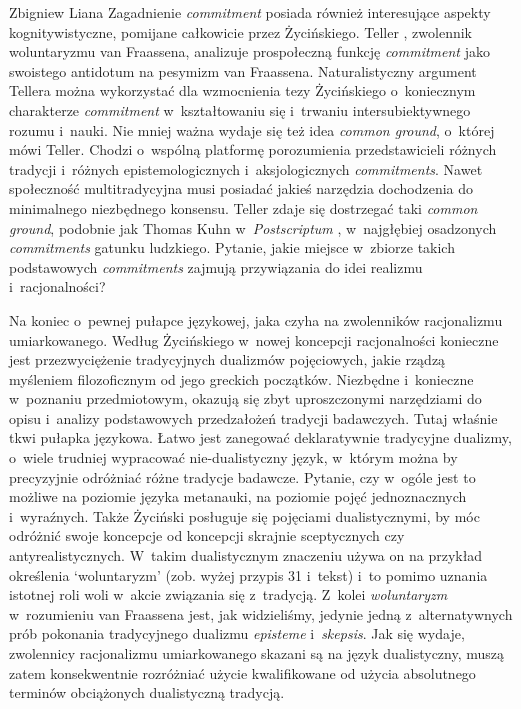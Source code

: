 \begin{artplenv}{Zbigniew Liana}
Zagadnienie \textit{commitment} posiada również interesujące aspekty kognitywistyczne, pomijane całkowicie przez Życińskiego. Teller
\parencite*[][s.~65n]{teller_learning_2011}, %
 zwolennik woluntaryzmu van Fraassena, analizuje prospołeczną funkcję \textit{commitment} jako swoistego antidotum na pesymizm van Fraassena. Naturalistyczny argument Tellera można wykorzystać dla wzmocnienia tezy Życińskiego o~koniecznym charakterze \textit{commitment} w~kształtowaniu się i~trwaniu intersubiektywnego rozumu i~nauki. Nie mniej ważna wydaje się też idea \textit{common ground}, o~której mówi Teller. Chodzi o~wspólną platformę porozumienia przedstawicieli różnych tradycji i~różnych epistemologicznych i~aksjologicznych \textit{commitments}. Nawet społeczność multitradycyjna musi posiadać jakieś narzędzia dochodzenia do minimalnego niezbędnego konsensu. Teller zdaje się dostrzegać taki \textit{common ground}, podobnie jak Thomas Kuhn w~\textit{Postscriptum} 
\parencite*[][s.~346n]{kuhn_struktura_2001}, %
 w~najgłębiej osadzonych \textit{commitments} gatunku ludzkiego. Pytanie, jakie miejsce w~zbiorze takich podstawowych \textit{commitments} zajmują przywiązania do idei realizmu i~racjonalności?

Na koniec o~pewnej pułapce językowej, jaka czyha na zwolenników racjonalizmu umiarkowanego. Według Życińskiego w~nowej koncepcji racjonalności konieczne jest przezwyciężenie tradycyjnych dualizmów pojęciowych, jakie rządzą myśleniem filozoficznym od jego greckich początków. Niezbędne i~konieczne w~poznaniu przedmiotowym, okazują się zbyt uproszczonymi narzędziami do opisu i~analizy podstawowych przedzałożeń tradycji badawczych. Tutaj właśnie tkwi pułapka językowa. Łatwo jest zanegować deklaratywnie tradycyjne dualizmy, o~wiele trudniej wypracować nie-dualistyczny język, w~którym można by precyzyjnie odróżniać różne tradycje badawcze. Pytanie, czy w~ogóle jest to możliwe na poziomie języka metanauki, na poziomie pojęć jednoznacznych i~wyraźnych. Także Życiński posługuje się pojęciami dualistycznymi, by móc odróżnić swoje koncepcje od koncepcji skrajnie sceptycznych czy antyrealistycznych. W~takim dualistycznym znaczeniu używa on na przykład określenia ‘woluntaryzm' (zob. wyżej przypis 31 i~tekst) i~to pomimo uznania istotnej roli woli w~akcie związania się z~tradycją. Z~kolei \textit{woluntaryzm} w~rozumieniu van Fraassena jest, jak widzieliśmy, jedynie jedną z~alternatywnych prób pokonania tradycyjnego dualizmu \textit{episteme} i~\textit{skepsis}. Jak się wydaje, zwolennicy racjonalizmu umiarkowanego skazani są na język dualistyczny, muszą zatem konsekwentnie rozróżniać użycie kwalifikowane od użycia absolutnego terminów obciążonych dualistyczną tradycją.

\end{artplenv}\label{liana-ende}
